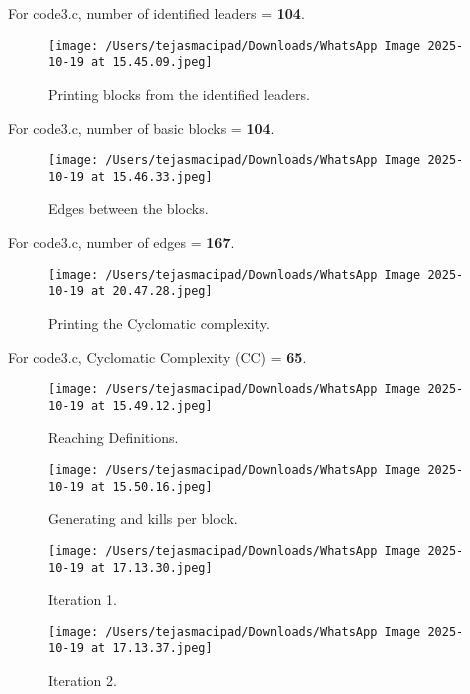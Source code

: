 \documentclass[12pt, a4paper]{report}
\begin{document}
\noindent For code3.c, number of identified leaders = \textbf{104}.

\begin{figure}[H]
\centering
\texttt{[image: /Users/tejasmacipad/Downloads/WhatsApp Image 2025-10-19 at 15.45.09.jpeg]}
\caption{Printing blocks from the identified leaders.}
\label{fig:diff-example-81}
\end{figure}

\noindent For code3.c, number of basic blocks = \textbf{104}.

\begin{figure}[H]
\centering
\texttt{[image: /Users/tejasmacipad/Downloads/WhatsApp Image 2025-10-19 at 15.46.33.jpeg]}
\caption{Edges between the blocks.}
\label{fig:diff-example-82}
\end{figure}

\noindent For code3.c, number of edges = \textbf{167}.

\begin{figure}[H]
\centering
\texttt{[image: /Users/tejasmacipad/Downloads/WhatsApp Image 2025-10-19 at 20.47.28.jpeg]}
\caption{Printing the Cyclomatic complexity.}
\label{fig:diff-example-83}
\end{figure}

\noindent For code3.c, Cyclomatic Complexity (CC) = \textbf{65}.

\begin{figure}[H]
\centering
\texttt{[image: /Users/tejasmacipad/Downloads/WhatsApp Image 2025-10-19 at 15.49.12.jpeg]}
\caption{Reaching Definitions.}
\label{fig:diff-example-84}
\end{figure}

\begin{figure}[H]
\centering
\texttt{[image: /Users/tejasmacipad/Downloads/WhatsApp Image 2025-10-19 at 15.50.16.jpeg]}
\caption{Generating and kills per block.}
\label{fig:diff-example-85}
\end{figure}

\begin{figure}[H]
\centering
\texttt{[image: /Users/tejasmacipad/Downloads/WhatsApp Image 2025-10-19 at 17.13.30.jpeg]}
\caption{Iteration 1.}
\label{fig:diff-example-86}
\end{figure}

\begin{figure}[H]
\centering
\texttt{[image: /Users/tejasmacipad/Downloads/WhatsApp Image 2025-10-19 at 17.13.37.jpeg]}
\caption{Iteration 2.}
\label{fig:diff-example-87}
\end{figure}
\end{document}
